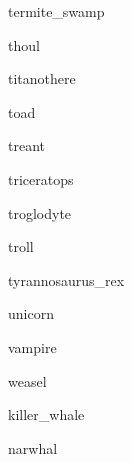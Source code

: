 \documentclass[letterpaper,serif]{module}
\begin{document}
\begin{newmonster}{termite_swamp}\end{newmonster}

\begin{newmonster}{thoul}\end{newmonster}

\begin{newmonster}{titanothere}\end{newmonster}

\begin{newmonster}{toad}\end{newmonster}

\begin{newmonster}{treant}\end{newmonster}

\begin{newmonster}{triceratops}\end{newmonster}

\begin{newmonster}{troglodyte}\end{newmonster}

\begin{newmonster}{troll}\end{newmonster}

\begin{newmonster}{tyrannosaurus_rex}\end{newmonster}

\begin{newmonster}{unicorn}\end{newmonster}

\begin{newmonster}{vampire}\end{newmonster}

\begin{newmonster}{weasel}\end{newmonster}

\begin{newmonster}{killer_whale}\end{newmonster}

\begin{newmonster}{narwhal}\end{newmonster}
\end{document}
